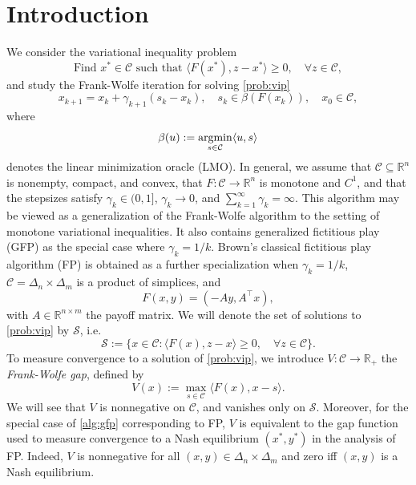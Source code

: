 \documentclass[pdflatex,sn-mathphys-num]{sn-jnl}%
\newcommand\argmin{\mathop{\rm argmin}}
\newcommand\R{\mathbb{R}}
\newcommand\C{\mathcal{C}}
\newcommand\mS{\mathcal{S}}
\theoremstyle{thmstyleone}%
\theoremstyle{thmstyletwo}%
\theoremstyle{thmstylethree}%
\begin{document}
\section{Introduction}\label{sec:intro}
We consider the variational inequality problem
\begin{equation} \tag{VIP} \label{prob:vip}
  \text{Find $x^* \in \C$ such that } \langle F(x^*), z-x^*\rangle \geq 0,
  \quad \forall z\in\C,
\end{equation}
and study the Frank-Wolfe iteration for solving \eqref{prob:vip}
\begin{equation} \label{alg:gfp} \tag{FW}
  x_{k+1} = x_k + \gamma_{k+1}(s_k - x_k),\quad s_k \in \beta(F(x_k)),\quad x_0 \in \C,
\end{equation}
where
\[
  \beta(u) := \argmin_{s\in\C}\langle{u, s}\rangle
\]
denotes the linear minimization oracle (LMO).
In general, we assume that $\C\subseteq\R^n$ is nonempty, compact, and convex, that $F:\C\to\R^n$ is monotone and $C^1$,
and that the stepsizes satisfy $\gamma_k\in(0,1]$, $\gamma_k\to 0$, and $\sum_{k=1}^\infty \gamma_k=\infty$.
This algorithm may be viewed as a generalization of the Frank-Wolfe algorithm \cite{FrankWolfe1956}
to the setting of monotone variational inequalities. It also contains generalized fictitious play (GFP)
\cite[Section~4.3.1]{Hammond1984} as the special case where $\gamma_k = 1/k$. Brown's classical fictitious
play algorithm (FP) \cite{Brown1951} is obtained as a further specialization when $\gamma_k = 1/k$, $\C = \Delta_n \times \Delta_m$ is a product of simplices,
and
\[
  F(x,y) = (-Ay, A^\top x),
\]
with $A \in \R^{n \times m}$ the payoff matrix.
We will denote the set of solutions to \eqref{prob:vip} by $\mS$, i.e.
\[
  \mS := \{x \in \C : \langle{F(x), z - x}\rangle \geq 0,\quad\forall z \in \C\}.
\]
To measure convergence to a solution of \eqref{prob:vip}, we introduce $V : \C \to \R_+$ the \textit{Frank-Wolfe gap}, defined by
\[
  V(x) := \max_{s \in \C}\langle{F(x), x - s}\rangle.
\]
We will see that $V$ is nonnegative on $\C$, and vanishes only on $\mS$. Moreover, for the special case of \eqref{alg:gfp}
corresponding to FP, $V$ is equivalent to the gap function used to measure convergence to a Nash equilibrium $(x^*,y^*)$ in the analysis of FP.
Indeed, $V$ is nonnegative for all $(x,y) \in \Delta_n\times\Delta_m$ and zero iff $(x,y)$ is a Nash equilibrium.
\end{document}
